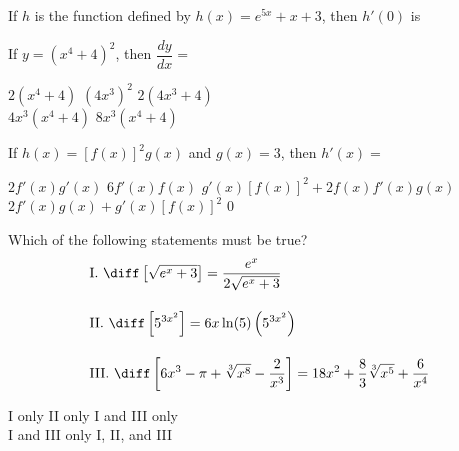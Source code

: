 \begin{questions}
    \question If $h$ is the function defined by $h(x) = e^{5x} + x + 3$, then $h'(0) $ is \\

    \begin{oneparchoices}
    \end{oneparchoices} \par \horizontalline

    \question If $y = \left(x^4 + 4\right)^2$, then $\dfrac{dy}{dx} = $ \\

    \begin{oneparchoices}
        \choice $2\left(x^4 + 4\right)$
        \choice $\left(4x^3\right)^2$
        \choice $2\left(4x^3 + 4\right)$ \\[11pt]
        \makebox[0.23 \textwidth] \choice $4x^3\left(x^4 + 4\right)$
        \makebox[0.25 \textwidth] \choice $8x^3\left(x^4 + 4\right)$
    \end{oneparchoices} \par \horizontalline

    \question If $h(x) = \left[f(x)\right]^2 g(x)$ and $g(x) = 3$, then $h'(x) = $ \\

    \begin{oneparchoices}
        \choice $2f'(x)g'(x)$
        \choice $6f'(x)f(x)$
        \choice $g'(x)\left[f(x)\right]^2 + 2f(x)f'(x)g(x)$ \\[11pt]
        \makebox[0.23 \textwidth] \choice $2f'(x)g(x) + g'(x)\left[f(x)\right]^2$
        \makebox[0.25 \textwidth] \choice $0$
    \end{oneparchoices} \par \horizontalline

    \question Which of the following statements must be true?
    \begin{align*}
        & \text{I. } \diff \left[\sqrt{e^x + 3}\right] = \dfrac{e^x}{2\sqrt{e^x + 3}} \\[11pt]
        & \text{II. } \diff\left[5^{3x^2}\right] = 6x\ln (5)\left(5^{3x^2}\right) \\[11pt]
        & \text{III. } \diff\left[6x^3 - \pi + \sqrt[3]{x^8} - \dfrac{2}{x^3}\right] = 18x^2 + \dfrac{8}{3}\sqrt[3]{x^5} + \dfrac{6}{x^4}
    \end{align*}

    \begin{oneparchoices}
        \choice I only 
        \choice II only 
        \choice I and III only \\[11pt]
        \makebox[0.2 \textwidth] \choice I and III only 
        \makebox[0.25 \textwidth] \choice I, II, and III
    \end{oneparchoices} \par \horizontalline
\end{questions}